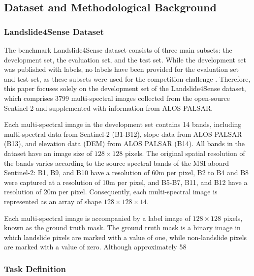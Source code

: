 \documentclass[12pt,a4paper]{report}
\begin{document}
	\label{Dataset and Methodological Background }
	\subsection{Dataset and Methodological Background }
	
\subsubsection{Landslide4Sense Dataset}

The benchmark Landslide4Sense dataset consists of three main subsets: the development set, the evaluation set, and the test set. While the development set was published with labels, no labels have been provided for the evaluation set and test set, as these subsets were used for the competition challenge \cite{ref18}. Therefore, this paper focuses solely on the development set of the Landslide4Sense dataset, which comprises 3799 multi-spectral images collected from the open-source Sentinel-2 and supplemented with information from ALOS PALSAR.

Each multi-spectral image in the development set contains 14 bands, including multi-spectral data from Sentinel-2 (B1-B12), slope data from ALOS PALSAR (B13), and elevation data (DEM) from ALOS PALSAR (B14). All bands in the dataset have an image size of $128 \times 128$ pixels. The original spatial resolution of the bands varies according to the source spectral bands of the MSI aboard Sentinel-2: B1, B9, and B10 have a resolution of 60m per pixel, B2 to B4 and B8 were captured at a resolution of 10m per pixel, and B5-B7, B11, and B12 have a resolution of 20m per pixel. Consequently, each multi-spectral image is represented as an array of shape $128 \times 128 \times 14$.

Each multi-spectral image is accompanied by a label image of $128 \times 128$ pixels, known as the ground truth mask. The ground truth mask is a binary image in which landslide pixels are marked with a value of one, while non-landslide pixels are marked with a value of zero. Although approximately 58%

\subsubsection{Task Definition}
\end{document}
